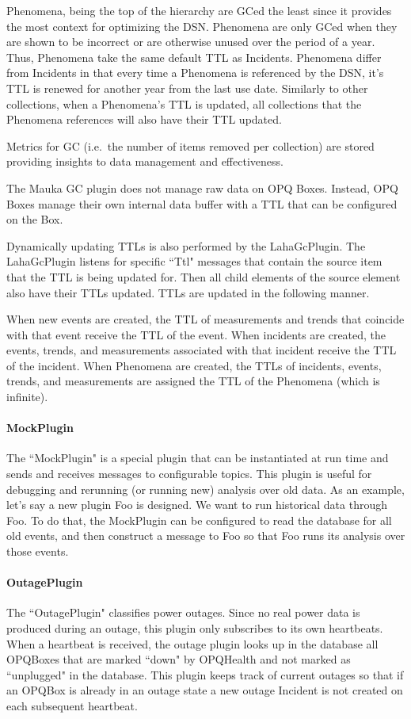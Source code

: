 Phenomena, being the top of the hierarchy are GCed the least since it provides the most context for optimizing the DSN. Phenomena are only GCed when they are shown to be incorrect or are otherwise unused over the period of a year. Thus, Phenomena take the same default TTL as Incidents. Phenomena differ from Incidents in that every time a Phenomena is referenced by the DSN, it's TTL is renewed for another year from the last use date. Similarly to other collections, when a Phenomena's TTL is updated, all collections that the Phenomena references will also have their TTL updated.

Metrics for GC (i.e.\ the number of items removed per collection) are stored providing insights to data management and effectiveness.

The Mauka GC plugin does not manage raw data on OPQ Boxes. Instead, OPQ Boxes manage their own internal data buffer with a TTL that can be configured on the Box.

Dynamically updating TTLs is also performed by the LahaGcPlugin. The LahaGcPlugin listens for specific ``Ttl" messages that contain the source item that the TTL is being updated for. Then all child elements of the source element also have their TTLs updated. TTLs are updated in the following manner.

When new events are created, the TTL of measurements and trends that coincide with that event receive the TTL of the event. When incidents are created, the events, trends, and measurements associated with that incident receive the TTL of the incident. When Phenomena are created, the TTLs of incidents, events, trends, and measurements are assigned the TTL of the Phenomena (which is infinite).

\paragraph{MockPlugin}
The ``MockPlugin" is a special plugin that can be instantiated at run time and sends and receives messages to configurable topics. This plugin is useful for debugging and rerunning (or running new) analysis over old data. As an example, let's say a new plugin Foo is designed. We want to run historical data through Foo. To do that, the MockPlugin can be configured to read the database for all old events, and then construct a message to Foo so that Foo runs its analysis over those events.

\paragraph{OutagePlugin}
The ``OutagePlugin" classifies power outages. Since no real power data is produced during an outage, this plugin only subscribes to its own heartbeats. When a heartbeat is received, the outage plugin looks up in the database all OPQBoxes that are marked ``down" by OPQHealth and not marked as ``unplugged" in the database. This plugin keeps track of current outages so that if an OPQBox is already in an outage state a new outage Incident is not created on each subsequent heartbeat.

